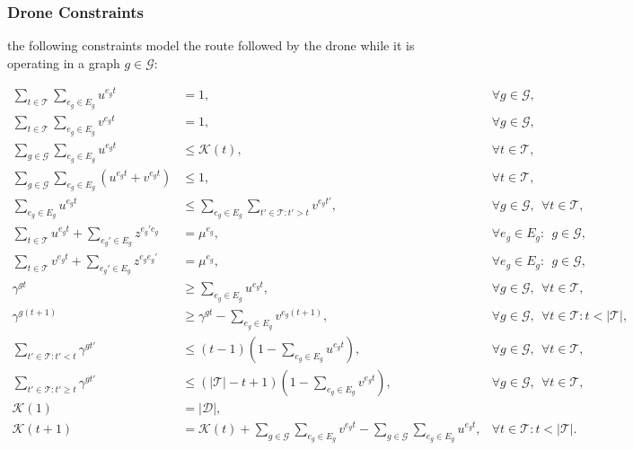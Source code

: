 \subsubsection*{Drone Constraints}
\noindent
{} 
 the following constraints model the route followed by the drone while it is operating in a graph $g\in \mathcal G$:

\begin{align}
\sum_{t \in \mathcal T} \sum_{e_g\in E_g} u^{e_g t} &= 1, &\forall g \in \mathcal{G}, \label{eq:drone1}\\ 
\sum_{t \in \mathcal T} \sum_{e_g\in E_g} v^{e_g t} &= 1, &\forall g \in \mathcal{G}, \label{eq:drone2}\\
\sum_{g\in\mathcal {G}} \sum_{e_g \in E_g} u^{e_g t} &\leq \mathcal{K}(t), &\forall t \in \mathcal T, \label{eq:drone3}\\
\sum_{g\in\mathcal {G}} \sum_{e_g \in E_g} (u^{e_g t} + v^{e_g t}) &\leq 1, &\forall t \in \mathcal T, \label{eq:drone4}\\
\sum_{e_g \in E_g} u^{e_g t} &\leq \sum_{e_g \in E_g} \sum_{t' \in \mathcal T: t'>t} v^{e_g t'}, &\forall g\in\mathcal G, \:\: \forall t \in \mathcal T, \label{eq:drone5}\\
\sum_{t \in \mathcal T} u^{e_g t} + \sum_{e_g' \in E_g}z^{e_g'e_g} &= \mu^{e_g}, &\forall e_g \in E_g: \:\:  g \in \mathcal{G}, \label{eq:drone6}\\
\sum_{t \in \mathcal T} v^{e_g t} + \sum_{e_g' \in E_g}z^{e_g e_g'} &= \mu^{e_g}, &\forall e_g \in E_g: \:\: g \in \mathcal{G}, \label{eq:drone7}\\
\gamma^{gt} &\geq \sum_{e_g \in E_g} u^{e_g t}, &\forall g \in \mathcal{G}, \:\: \forall t \in \mathcal T, \label{eq:drone8}\\
\gamma^{g(t+1)} &\geq \gamma^{gt} - \sum_{e_g \in E_g} v^{e_g (t+1)},  &\forall g \in \mathcal{G}, \:\: \forall t \in \mathcal T: t < |\mathcal T|, \label{eq:drone9}\\
\sum_{t'\in\mathcal T : t' < t} \gamma^{gt'} &\leq (t-1)(1- \sum_{e_g\in E_g} u^{e_g t}), &\forall g\in\mathcal G, \:\: \forall t \in \mathcal T, \label{eq:drone10}\\
\sum_{t' \in \mathcal T: t' \geq t} \gamma^{gt'} &\leq \left(|\mathcal T| - t + 1\right) (1- \sum_{e_g\in E_g}v^{e_g t}), &\forall g\in\mathcal G, \:\: \forall t \in \mathcal T, \label{eq:drone11}\\
\mathcal{K}(1) &= |\mathcal{D}|, \label{eq:drone12}\\
\mathcal{K}(t+1) &= \mathcal{K}(t) + \sum_{g\in\mathcal {G}} \sum_{e_g \in E_g} v^{e_g t} - \sum_{g\in\mathcal G}\sum_{e_g \in E_g} u^{e_g t}, &\forall t \in \mathcal T: t<|\mathcal T|. \label{eq:drone13}
\end{align}

